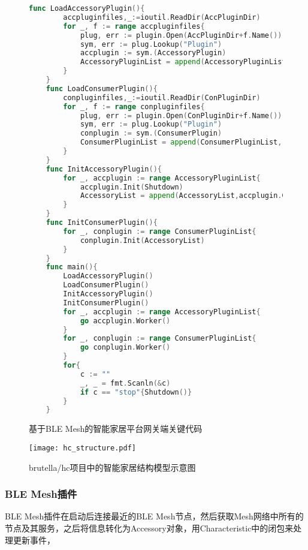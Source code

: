 \begin{figure}[H]
    \centering
    \begin{lstlisting}[language=Go]
    func LoadAccessoryPlugin(){
        accpluginfiles,_:=ioutil.ReadDir(AccPluginDir)
        for _, f := range accpluginfiles{
            plug, err := plugin.Open(AccPluginDir+f.Name())
            sym, err := plug.Lookup("Plugin")
            accplugin := sym.(AccessoryPlugin)
            AccessoryPluginList = append(AccessoryPluginList, accplugin)
        }
    }
    func LoadConsumerPlugin(){
        conpluginfiles,_:=ioutil.ReadDir(ConPluginDir)
        for _, f := range conpluginfiles{
            plug, err := plugin.Open(ConPluginDir+f.Name())
            sym, err := plug.Lookup("Plugin")
            conplugin := sym.(ConsumerPlugin)
            ConsumerPluginList = append(ConsumerPluginList, conplugin)
        }
    }
    func InitAccessoryPlugin(){
        for _, accplugin := range AccessoryPluginList{
            accplugin.Init(Shutdown)
            AccessoryList = append(AccessoryList,accplugin.GetAccessoryList()...)
        }
    }
    func InitConsumerPlugin(){
	    for _, conplugin := range ConsumerPluginList{
	    	conplugin.Init(AccessoryList)
	    }
    }
    func main(){
        LoadAccessoryPlugin()
        LoadConsumerPlugin()
        InitAccessoryPlugin()
        InitConsumerPlugin()
        for _, accplugin := range AccessoryPluginList{
            go accplugin.Worker()
        }
        for _, conplugin := range ConsumerPluginList{
            go conplugin.Worker()
        }
        for{
            c := ""
            _, _ = fmt.Scanln(&c)
            if c == "stop"{Shutdown()}
        }
    }
    \end{lstlisting}
    \caption{基于BLE Mesh的智能家居平台网关端关键代码}
    \label{fig:code_gateway}
\end{figure}

\begin{figure}[H]
    \centering
    \texttt{[image: hc\_structure.pdf]}
    \caption{brutella/hc项目中的智能家居结构模型示意图}
    \label{fig:hc_structure}
\end{figure}

\subsubsection{BLE Mesh插件}
BLE Mesh插件在启动后连接最近的BLE Mesh节点，然后获取Mesh网络中所有的节点及其服务，之后将信息转化为Accessory对象，用Characteristic中的闭包来处理更新事件，

